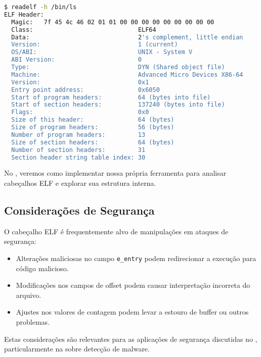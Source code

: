 \begin{lstlisting}[language=bash, caption={Exemplo de uso do readelf para analisar o cabeçalho ELF}, label={lst:readelf_example}]
$ readelf -h /bin/ls
ELF Header:
  Magic:   7f 45 4c 46 02 01 01 00 00 00 00 00 00 00 00 00 
  Class:                             ELF64
  Data:                              2's complement, little endian
  Version:                           1 (current)
  OS/ABI:                            UNIX - System V
  ABI Version:                       0
  Type:                              DYN (Shared object file)
  Machine:                           Advanced Micro Devices X86-64
  Version:                           0x1
  Entry point address:               0x6050
  Start of program headers:          64 (bytes into file)
  Start of section headers:          137240 (bytes into file)
  Flags:                             0x0
  Size of this header:               64 (bytes)
  Size of program headers:           56 (bytes)
  Number of program headers:         13
  Size of section headers:           64 (bytes)
  Number of section headers:         31
  Section header string table index: 30
\end{lstlisting}

No , veremos como implementar nossa própria ferramenta para analisar cabeçalhos ELF e explorar sua estrutura interna.

\subsection{Considerações de Segurança}\label{subsec:elf_header_security}

O cabeçalho ELF é frequentemente alvo de manipulações em ataques de segurança:

\begin{itemize}
    \item Alterações maliciosas no campo \texttt{e\_entry} podem redirecionar a execução para código malicioso.
    \item Modificações nos campos de offset podem causar interpretação incorreta do arquivo.
    \item Ajustes nos valores de contagem podem levar a estouro de buffer ou outros problemas.
\end{itemize}

Estas considerações são relevantes para as aplicações de segurança discutidas no , particularmente na  sobre detecção de malware.

